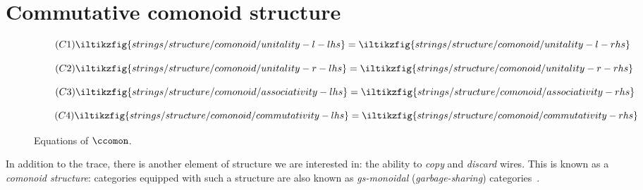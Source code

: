 \section{Commutative comonoid structure}

\begin{figure}
    \centering
    \begin{minipage}{0.2\textwidth}
        \begin{equation}
            \tag{\(\mathsf{C1}\)}
            \iltikzfig{strings/structure/comonoid/unitality-l-lhs}
            =
            \iltikzfig{strings/structure/comonoid/unitality-l-rhs}
            \label{eq:comonoid-unitality-l}
        \end{equation}
    \end{minipage}
    \begin{minipage}{0.22\textwidth}
        \begin{equation}
            \tag{\(\mathsf{C2}\)}
            \iltikzfig{strings/structure/comonoid/unitality-r-lhs}
            =
            \iltikzfig{strings/structure/comonoid/unitality-r-rhs}
            \label{eq:comonoid-unitality-r}
        \end{equation}
    \end{minipage}
    \begin{minipage}{0.27\textwidth}
        \begin{equation}
            \tag{\(\mathsf{C3}\)}
            \iltikzfig{strings/structure/comonoid/associativity-lhs}
            =
            \iltikzfig{strings/structure/comonoid/associativity-rhs}
            \label{eq:comonoid-associativity}
        \end{equation}
    \end{minipage}
    \begin{minipage}{0.27\textwidth}
        \begin{equation}
            \tag{\(\mathsf{C4}\)}
            \iltikzfig{strings/structure/comonoid/commutativity-lhs}
            =
            \iltikzfig{strings/structure/comonoid/commutativity-rhs}
            \label{eq:comonoid-commutativity}
        \end{equation}
    \end{minipage}
    \caption{Equations of \(\ccomon\).}
    \label{fig:comonoid-equations}
\end{figure}

In addition to the trace, there is another element of structure we are
interested in: the ability to \emph{copy} and \emph{discard} wires.
This is known as a \emph{comonoid structure}: categories equipped with such a
structure are also known as \emph{gs-monoidal}
(\emph{garbage-sharing}) categories~\cite{fritz2022free}.

